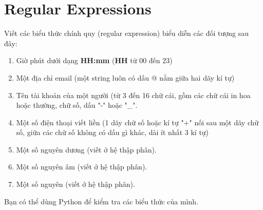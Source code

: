 \documentclass{article}
\begin{document}
\section{Regular Expressions}

Viết các biểu thức chính quy (regular expression) biểu diễn các đối tượng sau đây:

 \begin{em}
	\begin{enumerate}
        \item Giờ phút dưới dạng \textbf{HH:mm} (\textbf{HH} từ 00 đến 23)
        \item Một địa chỉ email (một string luôn có dấu @ nằm giữa hai dãy kí tự)
        \item Tên tài khoản của một người (từ 3 đến 16 chữ cái, gồm các chữ cái in hoa hoặc thường, chữ số, dấu "-" hoặc "\_".
        \item Một số điện thoại viết liền (1 dãy chữ số hoặc kí tự "+" nối sau một dãy chữ số, giữa các chữ số không có dấu gì khác, dài ít nhất 3 kí tự)
        \item Một số nguyên dương (viết ở hệ thập phân).
        \item Một số nguyên âm (viết ở hệ thập phân).
        \item Một số nguyên (viết ở hệ thập phân).
	\end{enumerate}
\end{em}

Bạn có thể dùng Python để kiểm tra các biểu thức của mình.
\end{document}
